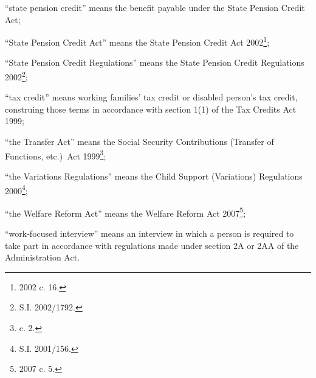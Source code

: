 \documentclass[12pt,a4paper]{article}
\begin{document}
\begin{enumerate}
“state pension credit” means the benefit payable under the State Pension Credit Act;

“State Pension Credit Act” means the State Pension Credit Act 2002\footnote{2002 c. 16.};

“State Pension Credit Regulations” means the State Pension Credit Regulations 2002\footnote{S.I. 2002/1792.};

“tax credit” means working families' tax credit or disabled person’s tax credit, construing those terms in accordance with section 1(1) of the Tax Credits Act 1999;

“the Transfer Act” means the Social Security Contributions (Transfer of Functions, etc.)\ Act 1999\footnote{ c. 2.};

“the Variations Regulations” means the Child Support (Variations) Regulations 2000\footnote{\frenchspacing S.I. 2001/156.};

“the Welfare Reform Act” means the Welfare Reform Act 2007\footnote{2007 c. 5.};



“work-focused interview” means an interview in which a person is required to take part in accordance with regulations made under section 2A or 2AA of the Administration Act.

\end{enumerate}
\end{document}
